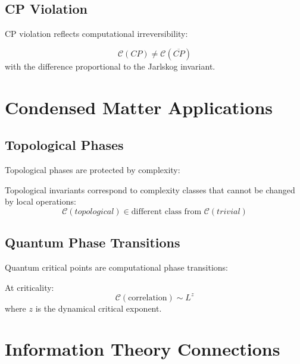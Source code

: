 \documentclass[12pt,a4paper]{article}
\newcommand{\comp}[1]{\mathcal{C}(#1)}
\begin{document}
\subsection{CP Violation}

CP violation reflects computational irreversibility:

\begin{proposition}
\begin{equation}
\comp{CP} \neq \comp{\overline{CP}}
\end{equation}
with the difference proportional to the Jarlskog invariant.
\end{proposition}

\section{Condensed Matter Applications}

\subsection{Topological Phases}

Topological phases are protected by complexity:

\begin{theorem}
Topological invariants correspond to complexity classes that cannot be changed by local operations:
\begin{equation}
\comp{topological} \in \text{different class from } \comp{trivial}
\end{equation}
\end{theorem}

\subsection{Quantum Phase Transitions}

Quantum critical points are computational phase transitions:

\begin{proposition}
At criticality:
\begin{equation}
\comp{\text{correlation}} \sim L^z
\end{equation}
where $z$ is the dynamical critical exponent.
\end{proposition}

\section{Information Theory Connections}
\end{document}
